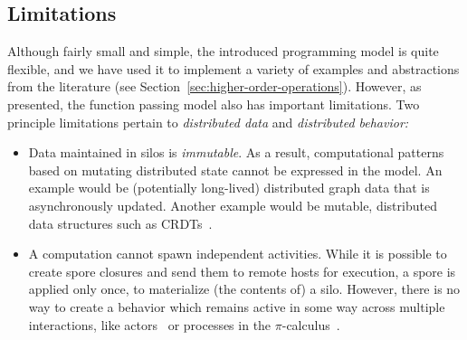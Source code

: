 \documentclass{jfp1}
\begin{document}


\subsection{Limitations}

Although fairly small and simple, the introduced programming model is
quite flexible, and we have used it to implement a variety of examples
and abstractions from the literature (see Section~\ref{sec:higher-order-operations}).
However, as presented, the function passing model also has important
limitations. Two principle limitations pertain to {\em distributed
  data} and {\em distributed behavior:}

\begin{itemize}

\item Data maintained in silos is {\em immutable}. As a result,
  computational patterns based on mutating distributed state cannot be
  expressed in the model. An example would be (potentially long-lived)
  distributed graph data that is asynchronously updated.  Another
  example would be mutable, distributed data structures such as
  CRDTs~\cite{ShapiroPBZ11}.

\item A computation cannot spawn independent activities. While it is
  possible to create spore closures and send them to remote hosts for
  execution, a spore is applied only once, to materialize (the
  contents of) a silo. However, there is no way to create a behavior
  which remains active in some way across multiple interactions, like
  actors~\cite{Actors} or processes in the
  $\pi$-calculus~\cite{milner:92a}.

\end{itemize}
\end{document}
